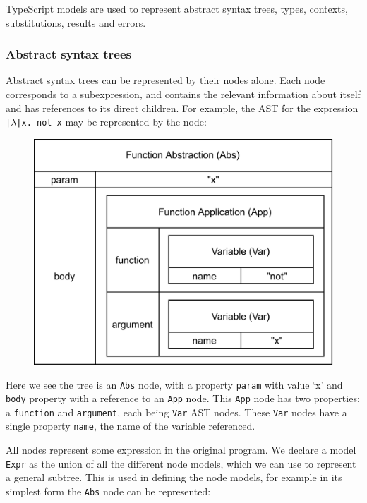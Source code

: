 \documentclass[a4paper,fleqn,oneside,12pt]{report}
\begin{document}
TypeScript models are used to represent abstract syntax trees, types, contexts, substitutions, results and errors.

\subsubsection{Abstract syntax trees}\label{id:h.26q0jf334v10}

Abstract syntax trees can be represented by their nodes alone. Each node corresponds to a subexpression, and contains the relevant information about itself and has references to its direct children. For example, the AST for the expression \texttt{|$\lambda$|x. not x} may be represented by the node:

{\centering \begin{figure}[h!]
  \centering
  \includegraphics[width=\linewidth]{images/image19.png}
\end{figure} \par}

Here we see the tree is an \texttt{Abs} node, with a property \texttt{param} with value `x' and \texttt{body} property with a reference to an \texttt{App} node. This \texttt{App} node has two properties: a \texttt{function} and \texttt{argument}, each being \texttt{Var} AST nodes. These \texttt{Var} nodes have a single property \texttt{name}, the name of the variable referenced.

All nodes represent some expression in the original program. We declare a model \texttt{Expr} as the union of all the different node models, which we can use to represent a general subtree. This is used in defining the node models, for example in its simplest form the \texttt{Abs} node can be represented:
\end{document}
